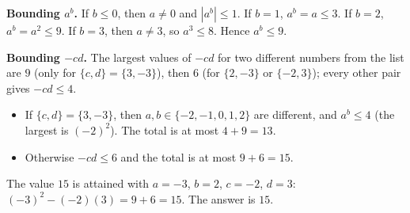 \textbf{Bounding $a^b$.} If $b\le0$, then $a\ne0$ and $\left|a^b\right|\le1$. If $b=1$, $a^b=a\le3$. If $b=2$, $a^b=a^2\le9$. If $b=3$, then $a\ne3$, so $a^3\le8$. Hence $a^b\le9$.

\textbf{Bounding $-cd$.} The largest values of $-cd$ for two different numbers from the list are $9$ (only for $\{c,d\}=\{3,-3\}$), then $6$ (for $\{2,-3\}$ or $\{-2,3\}$); every other pair gives $-cd\le4$.
\begin{itemize}
\item If $\{c,d\}=\{3,-3\}$, then $a,b\in\{-2,-1,0,1,2\}$ are different, and $a^b\le4$ (the largest is $(-2)^2$). The total is at most $4+9=13$.
\item Otherwise $-cd\le6$ and the total is at most $9+6=15$.
\end{itemize}
The value $15$ is attained with $a=-3$, $b=2$, $c=-2$, $d=3$: $(-3)^2-(-2)(3)=9+6=15$. The answer is $\boxed{15}$.
